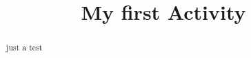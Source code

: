 \documentclass{ximera}
\title{My first Activity}
\begin{document}
\begin{abstract} just a test \end{abstract}
\maketitle
\end{document}
